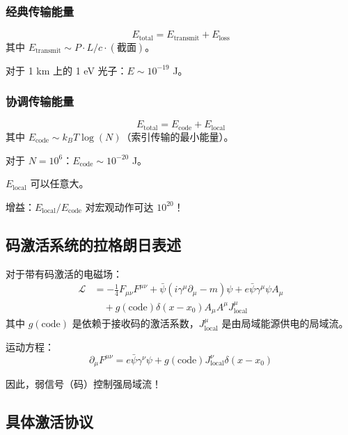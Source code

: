\documentclass[11pt,a4paper]{article}
\begin{document}
	\subsubsection{经典传输能量}
	\begin{equation}
		E_{\text{total}} = E_{\text{transmit}} + E_{\text{loss}}
	\end{equation}
	其中 $E_{\text{transmit}} \sim P \cdot L/c \cdot (\text{截面})$。
	
	对于 1 km 上的 1 eV 光子：$E \sim 10^{-19}$ J。
	
	\subsubsection{协调传输能量}
	\begin{equation}
		E_{\text{total}} = E_{\text{code}} + E_{\text{local}}
	\end{equation}
	其中 $E_{\text{code}} \sim k_B T \log(N)$（索引传输的最小能量）。
	
	对于 $N=10^6$：$E_{\text{code}} \sim 10^{-20}$ J。
	
	$E_{\text{local}}$ 可以任意大。
	
	增益：$E_{\text{local}} / E_{\text{code}}$ 对宏观动作可达 $10^{20}$！
	
	\subsection{码激活系统的拉格朗日表述}
	
	对于带有码激活的电磁场：
	\begin{align}
		\mathcal{L} &= -\frac{1}{4} F_{\mu\nu} F^{\mu\nu} + \bar{\psi}(i\gamma^\mu\partial_\mu - m)\psi + e\bar{\psi}\gamma^\mu\psi A_\mu \\
		&\quad + g(\text{code}) \delta(x - x_0) A_\mu A^\mu J_{\text{local}}^\mu
	\end{align}
	其中 $g(\text{code})$ 是依赖于接收码的激活系数，$J_{\text{local}}^\mu$ 是由局域能源供电的局域流。
	
	运动方程：
	\begin{equation}
		\partial_\mu F^{\mu\nu} = e\bar{\psi}\gamma^\nu\psi + g(\text{code}) J_{\text{local}}^\nu \delta(x - x_0)
	\end{equation}
	
	因此，弱信号（码）控制强局域流！
	
	\subsection{具体激活协议}
	
\end{document}
